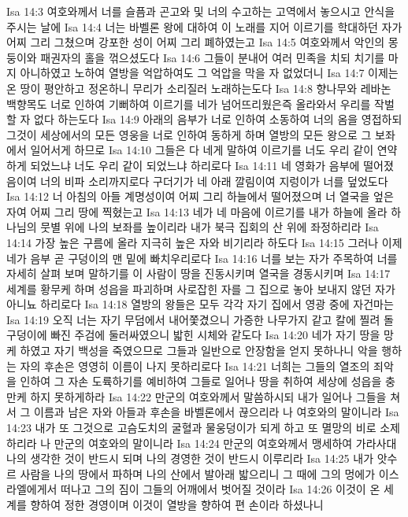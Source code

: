 Isa 14:3  여호와께서 너를 슬픔과 곤고와 및 너의 수고하는 고역에서 놓으시고 안식을 주시는 날에
Isa 14:4  너는 바벨론 왕에 대하여 이 노래를 지어 이르기를 학대하던 자가 어찌 그리 그쳤으며 강포한 성이 어찌 그리 폐하였는고
Isa 14:5  여호와께서 악인의 몽둥이와 패권자의 홀을 꺾으셨도다
Isa 14:6  그들이 분내어 여러 민족을 치되 치기를 마지 아니하였고 노하여 열방을 억압하여도 그 억압을 막을 자 없었더니
Isa 14:7  이제는 온 땅이 평안하고 정온하니 무리가 소리질러 노래하는도다
Isa 14:8  향나무와 레바논 백향목도 너로 인하여 기뻐하여 이르기를 네가 넘어뜨리웠은즉 올라와서 우리를 작벌할 자 없다 하는도다
Isa 14:9  아래의 음부가 너로 인하여 소동하여 너의 옴을 영접하되 그것이 세상에서의 모든 영웅을 너로 인하여 동하게 하며 열방의 모든 왕으로 그 보좌에서 일어서게 하므로
Isa 14:10  그들은 다 네게 말하여 이르기를 너도 우리 같이 연약하게 되었느냐 너도 우리 같이 되었느냐 하리로다
Isa 14:11  네 영화가 음부에 떨어졌음이여 너의 비파 소리까지로다 구더기가 네 아래 깔림이여 지렁이가 너를 덮었도다
Isa 14:12  너 아침의 아들 계명성이여 어찌 그리 하늘에서 떨어졌으며 너 열국을 엎은 자여 어찌 그리 땅에 찍혔는고
Isa 14:13  네가 네 마음에 이르기를 내가 하늘에 올라 하나님의 뭇별 위에 나의 보좌를 높이리라 내가 북극 집회의 산 위에 좌정하리라
Isa 14:14  가장 높은 구름에 올라 지극히 높은 자와 비기리라 하도다
Isa 14:15  그러나 이제 네가 음부 곧 구덩이의 맨 밑에 빠치우리로다
Isa 14:16  너를 보는 자가 주목하여 너를 자세히 살펴 보며 말하기를 이 사람이 땅을 진동시키며 열국을 경동시키며
Isa 14:17  세계를 황무케 하며 성읍을 파괴하며 사로잡힌 자를 그 집으로 놓아 보내지 않던 자가 아니뇨 하리로다
Isa 14:18  열방의 왕들은 모두 각각 자기 집에서 영광 중에 자건마는
Isa 14:19  오직 너는 자기 무덤에서 내어쫓겼으니 가증한 나무가지 같고 칼에 찔려 돌구덩이에 빠진 주검에 둘러싸였으니 밟힌 시체와 같도다
Isa 14:20  네가 자기 땅을 망케 하였고 자기 백성을 죽였으므로 그들과 일반으로 안장함을 얻지 못하나니 악을 행하는 자의 후손은 영영히 이름이 나지 못하리로다
Isa 14:21  너희는 그들의 열조의 죄악을 인하여 그 자손 도륙하기를 예비하여 그들로 일어나 땅을 취하여 세상에 성읍을 충만케 하지 못하게하라
Isa 14:22  만군의 여호와께서 말씀하시되 내가 일어나 그들을 쳐서 그 이름과 남은 자와 아들과 후손을 바벨론에서 끊으리라 나 여호와의 말이니라
Isa 14:23  내가 또 그것으로 고슴도치의 굴혈과 물웅덩이가 되게 하고 또 멸망의 비로 소제하리라 나 만군의 여호와의 말이니라
Isa 14:24  만군의 여호와께서 맹세하여 가라사대 나의 생각한 것이 반드시 되며 나의 경영한 것이 반드시 이루리라
Isa 14:25  내가 앗수르 사람을 나의 땅에서 파하며 나의 산에서 발아래 밟으리니 그 때에 그의 멍에가 이스라엘에게서 떠나고 그의 짐이 그들의 어깨에서 벗어질 것이라
Isa 14:26  이것이 온 세계를 향하여 정한 경영이며 이것이 열방을 향하여 편 손이라 하셨나니
